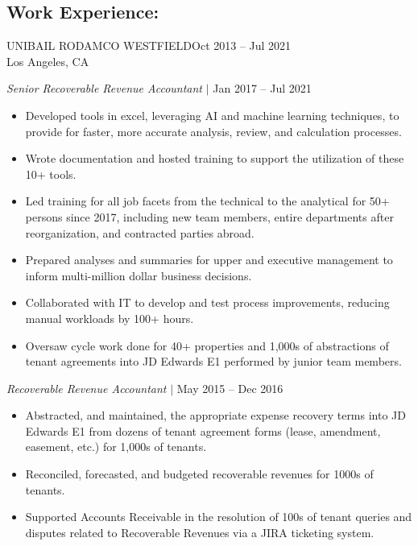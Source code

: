 \documentclass[11pt]{res}%
\begin{document}
\begin{resume}
\section{Work Experience:}%
\label{sec:WorkExperience}%
UNIBAIL RODAMCO WESTFIELD\hfill Oct 2013 -- Jul 2021\\%
Los Angeles, CA%
\begin{adjustwidth}{0.05\textwidth}{0.0\textwidth}
\textit{Senior Recoverable Revenue Accountant} $|$ Jan 2017 -- Jul 2021
\vspace*{-0.010000\textwidth}
\begin{itemize}%
\setlength\itemsep{-0.2em}%
\item%
Developed tools in excel, leveraging AI and machine learning techniques, to provide for faster, more accurate analysis, review, and calculation processes.%
\item%
Wrote documentation and hosted training to support the utilization of these 10+ tools.%
\item%
Led training for all job facets from the technical to the analytical for 50+ persons since 2017, including new team members, entire departments after reorganization, and contracted parties abroad.%
\item%
Prepared analyses and summaries for upper and executive management to inform multi{-}million dollar business decisions.%
\item%
Collaborated with IT to develop and test process improvements, reducing manual workloads by 100+ hours.%
\item%
Oversaw cycle work done for 40+ properties and 1,000s of abstractions of tenant agreements into JD Edwards E1 performed by junior team members.%
\end{itemize}
\end{adjustwidth}%
\begin{adjustwidth}{0.05\textwidth}{0.0\textwidth}
\textit{Recoverable Revenue Accountant} $|$ May 2015 -- Dec 2016
\vspace*{-0.010000\textwidth}
\begin{itemize}%
\setlength\itemsep{-0.2em}%
\item%
Abstracted, and maintained, the appropriate expense recovery terms into JD Edwards E1 from dozens of tenant agreement forms (lease, amendment, easement, etc.) for 1,000s of tenants.%
\item%
Reconciled, forecasted, and budgeted recoverable revenues for 1000s of tenants.%
\item%
Supported Accounts Receivable in the resolution of 100s of tenant queries and disputes related to Recoverable Revenues via a JIRA ticketing system. %

\end{itemize}
\end{adjustwidth}
\end{resume}
\end{document}
